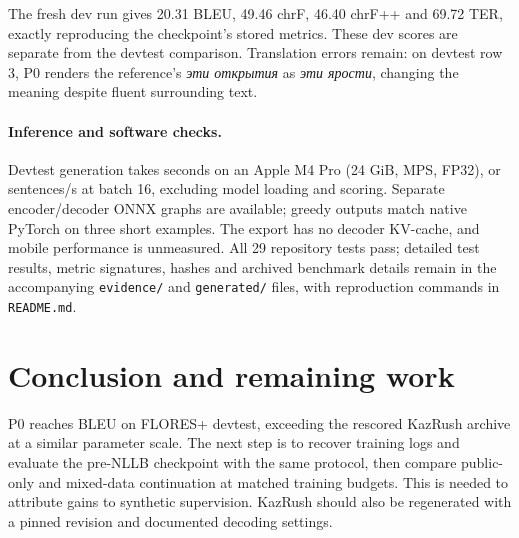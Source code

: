 \documentclass{article}
\begin{document}
The fresh dev run gives 20.31 BLEU, 49.46 chrF, 46.40 chrF++ and 69.72 TER,
exactly reproducing the checkpoint's stored metrics. These dev scores are
separate from the devtest comparison. Translation errors remain: on devtest
row 3, P0 renders the reference's \emph{\cyrillicfont эти открытия} as \emph{\cyrillicfont эти ярости},
changing the meaning despite fluent surrounding text.

\paragraph{Inference and software checks.}
Devtest generation takes \EvalSeconds{} seconds on an Apple M4 Pro
(24 GiB, MPS, FP32), or \EvalThroughput{} sentences/s at batch 16,
excluding model loading and scoring. Separate encoder/decoder ONNX graphs
are available; greedy outputs match native PyTorch on three short examples.
The export has no decoder KV-cache, and mobile performance is unmeasured.
All 29 repository tests pass; detailed test results, metric signatures,
hashes and archived benchmark details remain in the accompanying
\texttt{evidence/} and \texttt{generated/} files, with reproduction commands
in \texttt{README.md}.

\section{Conclusion and remaining work}
P0 reaches \PZeroBLEU{} BLEU on FLORES+ devtest, exceeding the rescored
KazRush archive at a similar parameter scale. The next step is to recover
training logs and evaluate the pre-NLLB checkpoint with the same protocol,
then compare public-only and mixed-data continuation at matched training
budgets. This is needed to attribute gains to synthetic supervision.
KazRush should also be regenerated with a pinned revision and documented
decoding settings.


\begingroup\small

\endgroup
\end{document}
